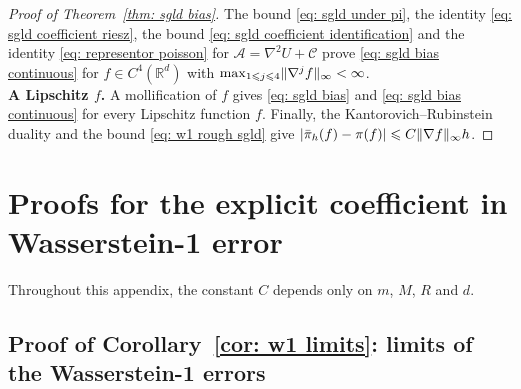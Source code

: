 \begin{proof}[Proof of Theorem~\ref{thm: sgld bias}]
    The bound \eqref{eq: sgld under pi}, the identity \eqref{eq: sgld coefficient riesz}, the bound \eqref{eq: sgld coefficient identification} and the identity \eqref{eq: representor poisson} for $\mathcal A = \nabla^2 U + \mathcal C$ prove \eqref{eq: sgld bias continuous} for $f \in C^4(\mathbb R^d)$ with $\max_{1 \leqslant j \leqslant 4} \lVert \nabla^j f \rVert_\infty < \infty$.\\[6pt]
    \textbf{A Lipschitz $f$.} A mollification of $f$ gives \eqref{eq: sgld bias} and \eqref{eq: sgld bias continuous} for every Lipschitz function $f$. Finally, the Kantorovich--Rubinstein duality and the bound \eqref{eq: w1 rough sgld} give $|\bar\pi_h(f) - \pi(f)| \leqslant C \lVert \nabla f \rVert_\infty h$.
\end{proof}



\section{Proofs for the explicit coefficient in Wasserstein-1 error}
\label{app: w1}

Throughout this appendix, the constant $C$ depends only on $m$, $M$, $R$ and $d$.



\subsection{Proof of Corollary~\ref{cor: w1 limits}: limits of the Wasserstein-1 errors}
\label{sec: w1 limits proof}

